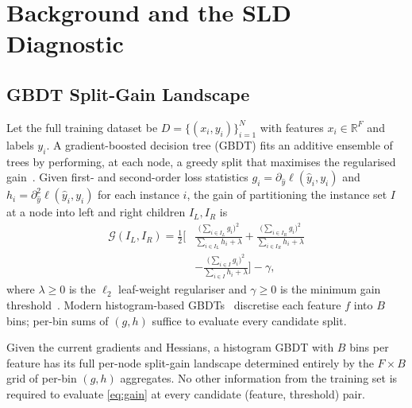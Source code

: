 
\section{Background and the SLD Diagnostic}
\label{sec:diagnostic}

\subsection{GBDT Split-Gain Landscape}

Let the full training dataset be $D = \{(x_i, y_i)\}_{i=1}^{N}$ with features
$x_i \in \mathbb{R}^F$ and labels $y_i$. A gradient-boosted decision tree
(GBDT) fits an additive ensemble of trees by performing, at each node, a
greedy split that maximises the regularised gain~\cite{friedman2001gbm,
chen2016xgboost}. Given first- and second-order loss statistics
$g_i = \partial_{\hat{y}} \ell(\hat{y}_i, y_i)$ and
$h_i = \partial^2_{\hat{y}} \ell(\hat{y}_i, y_i)$ for each instance $i$, the
gain of partitioning the instance set $I$ at a node into left and right
children $I_L, I_R$ is
%
\begin{equation}
  \label{eq:gain}
  \begin{aligned}
  \mathcal{G}(I_L, I_R) = \frac{1}{2}\Bigg[
      &\frac{\bigl(\sum_{i \in I_L} g_i\bigr)^2}{\sum_{i \in I_L} h_i + \lambda}
    + \frac{\bigl(\sum_{i \in I_R} g_i\bigr)^2}{\sum_{i \in I_R} h_i + \lambda} \\
    &- \frac{\bigl(\sum_{i \in I} g_i\bigr)^2}{\sum_{i \in I} h_i + \lambda}
    \Bigg] - \gamma,
  \end{aligned}
\end{equation}
%
where $\lambda \geq 0$ is the $\ell_2$ leaf-weight regulariser and
$\gamma \geq 0$ is the minimum gain threshold~\cite{chen2016xgboost}. Modern
histogram-based GBDTs~\cite{ke2017lightgbm,prokhorenkova2018catboost} discretise
each feature $f$ into $B$ bins; per-bin sums of $(g, h)$ suffice to evaluate
every candidate split.

\begin{lemma}
\label{lem:histogram}
Given the current gradients and Hessians, a histogram GBDT with $B$ bins per
feature has its full per-node split-gain landscape determined entirely by the
$F \times B$ grid of per-bin $(g, h)$ aggregates. No other information from the
training set is required to evaluate \eqref{eq:gain} at every candidate
(feature, threshold) pair.
\end{lemma}


